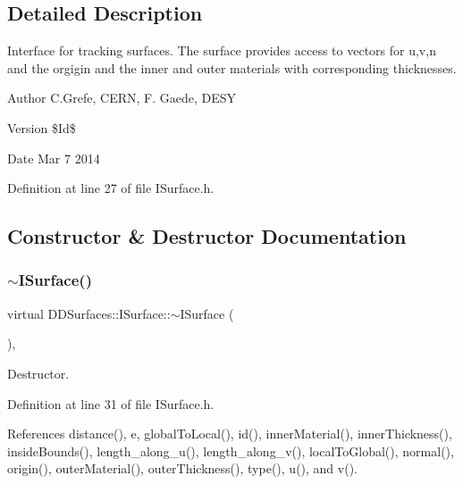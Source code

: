 \subsection{Detailed Description}
Interface for tracking surfaces. The surface provides access to vectors for u,v,n and the orgigin and the inner and outer materials with corresponding thicknesses.

\begin{DoxyAuthor}{Author}
C.\+Grefe, C\+E\+RN, F. Gaede, D\+E\+SY 
\end{DoxyAuthor}
\begin{DoxyVersion}{Version}
\$\+Id\$ 
\end{DoxyVersion}
\begin{DoxyDate}{Date}
Mar 7 2014 
\end{DoxyDate}


Definition at line 27 of file I\+Surface.\+h.



\subsection{Constructor \& Destructor Documentation}
\hypertarget{class_d_d_surfaces_1_1_i_surface_a80873dc47fb91dabae0f389de8b32055}{}\label{class_d_d_surfaces_1_1_i_surface_a80873dc47fb91dabae0f389de8b32055} 
\subsubsection{\texorpdfstring{$\sim$\+I\+Surface()}{~ISurface()}}
{\footnotesize\ttfamily virtual D\+D\+Surfaces\+::\+I\+Surface\+::$\sim$\+I\+Surface (\begin{DoxyParamCaption}{ }\end{DoxyParamCaption})\hspace{0.3cm}{\ttfamily [inline]}, {\ttfamily [virtual]}}



Destructor. 



Definition at line 31 of file I\+Surface.\+h.



References distance(), e, global\+To\+Local(), id(), inner\+Material(), inner\+Thickness(), inside\+Bounds(), length\+\_\+along\+\_\+u(), length\+\_\+along\+\_\+v(), local\+To\+Global(), normal(), origin(), outer\+Material(), outer\+Thickness(), type(), u(), and v().



